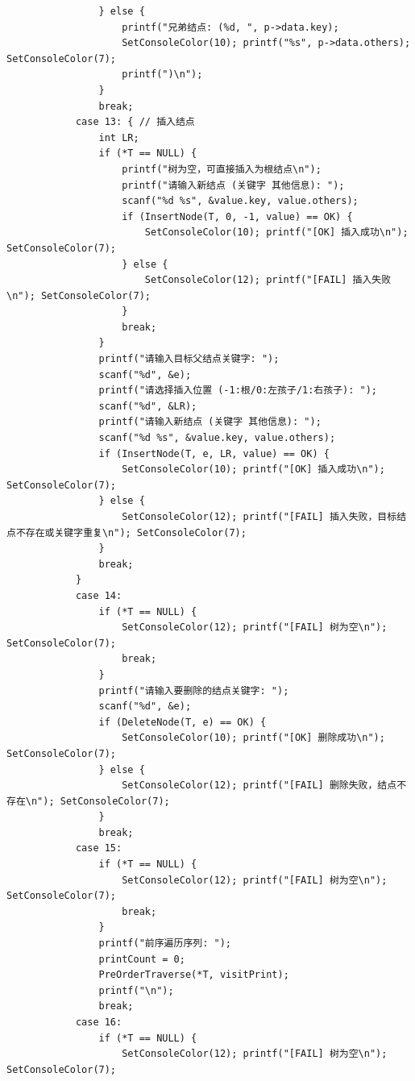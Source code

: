 \documentclass[supercite]{Experimental_Report}
\begin{document}
{\begin{lstlisting}
                } else {
                    printf("兄弟结点: (%d, ", p->data.key);
                    SetConsoleColor(10); printf("%s", p->data.others); SetConsoleColor(7);
                    printf(")\n");
                }
                break;
            case 13: { // 插入结点
                int LR;
                if (*T == NULL) {
                    printf("树为空，可直接插入为根结点\n");
                    printf("请输入新结点 (关键字 其他信息): ");
                    scanf("%d %s", &value.key, value.others);
                    if (InsertNode(T, 0, -1, value) == OK) {
                        SetConsoleColor(10); printf("[OK] 插入成功\n"); SetConsoleColor(7);
                    } else {
                        SetConsoleColor(12); printf("[FAIL] 插入失败\n"); SetConsoleColor(7);
                    }
                    break;
                }
                printf("请输入目标父结点关键字: ");
                scanf("%d", &e);
                printf("请选择插入位置 (-1:根/0:左孩子/1:右孩子): ");
                scanf("%d", &LR);
                printf("请输入新结点 (关键字 其他信息): ");
                scanf("%d %s", &value.key, value.others);
                if (InsertNode(T, e, LR, value) == OK) {
                    SetConsoleColor(10); printf("[OK] 插入成功\n"); SetConsoleColor(7);
                } else {
                    SetConsoleColor(12); printf("[FAIL] 插入失败，目标结点不存在或关键字重复\n"); SetConsoleColor(7);
                }
                break;
            }
            case 14:
                if (*T == NULL) {
                    SetConsoleColor(12); printf("[FAIL] 树为空\n"); SetConsoleColor(7);
                    break;
                }
                printf("请输入要删除的结点关键字: ");
                scanf("%d", &e);
                if (DeleteNode(T, e) == OK) {
                    SetConsoleColor(10); printf("[OK] 删除成功\n"); SetConsoleColor(7);
                } else {
                    SetConsoleColor(12); printf("[FAIL] 删除失败，结点不存在\n"); SetConsoleColor(7);
                }
                break;
            case 15:
                if (*T == NULL) {
                    SetConsoleColor(12); printf("[FAIL] 树为空\n"); SetConsoleColor(7);
                    break;
                }
                printf("前序遍历序列: ");
                printCount = 0;
                PreOrderTraverse(*T, visitPrint);
                printf("\n");
                break;
            case 16:
                if (*T == NULL) {
                    SetConsoleColor(12); printf("[FAIL] 树为空\n"); SetConsoleColor(7);

\end{lstlisting}}
\end{document}
